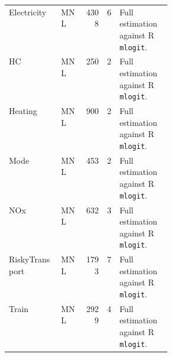 {\begin{longtable}{@{}llrrp{0.32\linewidth}@{}}
Electricity & MNL & 4308 & 6 & Full estimation against R \texttt{mlogit}. \\
HC & MNL & 250 & 2 & Full estimation against R \texttt{mlogit}. \\
Heating & MNL & 900 & 2 & Full estimation against R \texttt{mlogit}. \\
Mode & MNL & 453 & 2 & Full estimation against R \texttt{mlogit}. \\
NOx & MNL & 632 & 3 & Full estimation against R \texttt{mlogit}. \\
RiskyTransport & MNL & 1793 & 7 & Full estimation against R \texttt{mlogit}. \\
Train & MNL & 2929 & 4 & Full estimation against R \texttt{mlogit}. \\
\end{longtable}
}
